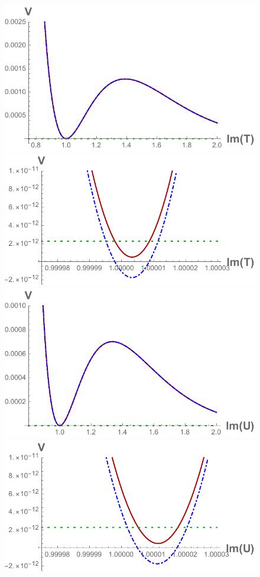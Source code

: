 \documentclass[a4paper,12pt]{report}
\begin{document}
\begin{figure}[H]
\includegraphics[scale=0.55]{quevedo_38_T_large.pdf}\qquad\includegraphics[scale=0.59]{quevedo_38_T_close.pdf}\\
\includegraphics[scale=0.55]{quevedo_38_U_large.pdf}\qquad\includegraphics[scale=0.59]{quevedo_38_U_close.pdf}

\end{figure}
\end{document}
